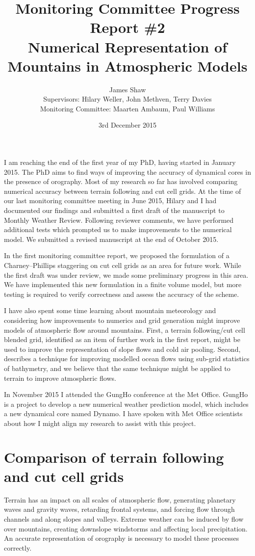 \documentclass[a4paper]{article}
\title{Monitoring Committee Progress Report \#2\\
\vspace*{1em}
\Large{Numerical Representation of Mountains in Atmospheric Models}}
\author{James Shaw
\vspace{0.5em} \\
\large{Supervisors: Hilary Weller, John Methven, Terry Davies}
\vspace{0.5em} \\
\large{Monitoring Committee: Maarten Ambaum, Paul Williams}}
\date{3rd December 2015}
\begin{document}
\newcommand{\exner}{\Pi}
\newcommand{\TODO}[1]{\textcolor{purple}{TODO: \emph{#1}}}
\maketitle


I am reaching the end of the first year of my PhD, having started in January 2015.
The PhD aims to find ways of improving the accuracy of dynamical cores in the presence of orography.
Most of my research so far has involved comparing numerical accuracy between terrain following and cut cell grids.
At the time of our last monitoring committee meeting in June 2015, Hilary and I had documented our findings and submitted a first draft of the manuscript to Monthly Weather Review.  Following reviewer comments, we have performed additional tests which prompted us to make improvements to the numerical model.  We submitted a revised manuscript at the end of October 2015.

In the first monitoring committee report, we proposed the formulation of a Charney--Phillips staggering on cut cell grids as an area for future work.  While the first draft was under review, we made some preliminary progress in this area.  We have implemented this new formulation in a finite volume model, but more testing is required to verify correctness and assess the accuracy of the scheme.

I have also spent some time learning about mountain meteorology and considering how improvements to numerics and grid generation might improve models of atmospheric flow around mountains.  First, a terrain following/cut cell blended grid, identified as an item of further work in the first report, might be used to improve the representation of slope flows and cold air pooling.  Second, \citet{adcroft2013} describes a technique for improving modelled ocean flows using sub-grid statistics of bathymetry, and we believe that the same technique might be applied to terrain to improve atmospheric flows.

In November 2015 I attended the GungHo conference at the Met Office.  GungHo is a project to develop a new numerical weather prediction model, which includes a new dynamical core named Dynamo.  I have spoken with Met Office scientists about how I might align my research to assist with this project.

\section{Comparison of terrain following and cut cell grids}
Terrain has an impact on all scales of atmospheric flow, generating planetary waves and gravity waves, retarding frontal systems, and forcing flow through channels and along slopes and valleys.  Extreme weather can be induced by flow over mountains, creating downslope windstorms and affecting local precipitation.  An accurate representation of orography is necessary to model these processes correctly.
\end{document}

